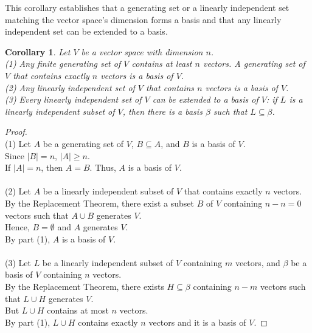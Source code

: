 \documentclass[12pt, reqno]{amsart}
\newtheorem{corollary}[theorem]{Corollary}
\theoremstyle{definition}
\numberwithin{equation}{section}
\newcommand{\tabb}{\hspace*{1cm}}
\begin{document}
This corollary establishes that a generating set or a linearly independent set matching the vector space's dimension forms a basis and that any linearly independent set can be extended to a basis.
    \begin{corollary}
    Let $V$ be a vector space with dimension $n$.\\
    (1) Any finite generating set of $V$ contains at least $n$ vectors. A generating set of $V$ that contains exactly $n$ vectors is a basis of $V$.\\
    (2) Any linearly independent set of $V$ that contains $n$ vectors is a basis of $V$.\\
    (3) Every linearly independent set of $V$ can be extended to a basis of $V$: if $L$ is a linearly independent subset of $V$, then there is a basis $\beta$ such that $L \subseteq \beta$.
    \end{corollary}

    \begin{proof} \hfill \\
        (1) Let $A$ be a generating set of $V$, $B \subseteq A$, and $B$ is a basis of $V$.\\
        Since $|B| = n$, $|A| \geq n$.\\
        \tabb If $|A|=n$, then $A = B$. Thus, $A$ is a basis of $V$.\\
        \\
        (2) Let $A$ be a linearly independent subset of $V$ that contains exactly $n$ vectors.\\
        By the Replacement Theorem, there exist a subset $B$ of $V$ containing $n-n=0$ vectors such that $A \cup B$ generates $V$.\\
        Hence, $B= \emptyset$ and $A$ generates $V$.\\
        \tabb By part (1), $A$ is a basis of $V$.\\
        \\
        (3) Let $L$ be a linearly independent subset of $V$ containing $m$ vectors, and $\beta$ be a basis of $V$ containing $n$ vectors.\\
        By the Replacement Theorem, there exists $H \subseteq \beta$ containing $n-m$ vectors such that $L \cup H$ generates $V$.\\
        But $L \cup H$ contains at most $n$ vectors.\\
        \tabb By part (1), $L \cup H$ contains exactly $n$ vectors and it is a basis of $V$.
    \end{proof}
\end{document}
